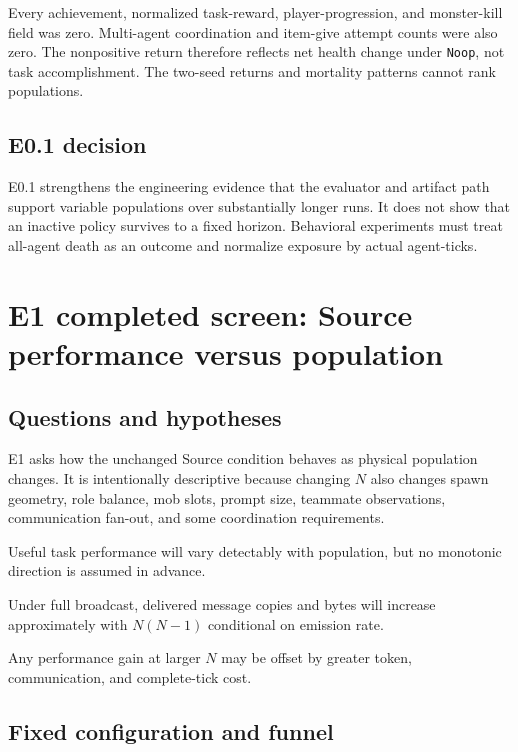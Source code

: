 \documentclass[11pt]{article}
\newcommand{\code}[1]{\texttt{#1}}
\begin{document}
Every achievement, normalized task-reward, player-progression, and monster-kill
field was zero.  Multi-agent coordination and item-give attempt counts were
also zero.  The nonpositive return therefore reflects net health change under
\code{Noop}, not task accomplishment.  The two-seed returns and mortality
patterns cannot rank populations.

\subsection{E0.1 decision}

E0.1 strengthens the engineering evidence that the evaluator and artifact path
support variable populations over substantially longer runs.  It does not show
that an inactive policy survives to a fixed horizon.  Behavioral experiments
must treat all-agent death as an outcome and normalize exposure by actual
agent-ticks.

\section{E1 completed screen: Source performance versus population}

\subsection{Questions and hypotheses}

E1 asks how the unchanged Source condition behaves as physical population
changes.  It is intentionally descriptive because changing $N$ also changes
spawn geometry, role balance, mob slots, prompt size, teammate observations,
communication fan-out, and some coordination requirements.

\begin{description}[style=nextline,leftmargin=1.5em]
  \item[H1a: behavioral scaling.]
  Useful task performance will vary detectably with population, but no
  monotonic direction is assumed in advance.
  \item[H1b: communication scaling.]
  Under full broadcast, delivered message copies and bytes will increase
  approximately with $N(N-1)$ conditional on emission rate.
  \item[H1c: efficiency tradeoff.]
  Any performance gain at larger $N$ may be offset by greater token,
  communication, and complete-tick cost.
\end{description}

\subsection{Fixed configuration and funnel}
\end{document}
